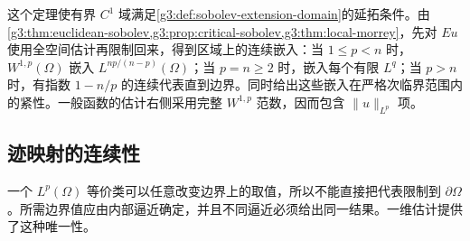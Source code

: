 这个定理使有界 \(C^1\) 域满足\cref{g3:def:sobolev-extension-domain}的延拓条件。由\cref{g3:thm:euclidean-sobolev,g3:prop:critical-sobolev,g3:thm:local-morrey}，先对 \(Eu\) 使用全空间估计再限制回来，得到区域上的连续嵌入：当 \(1\le p<n\) 时，\(W^{1,p}(\Omega)\) 嵌入 \(L^{np/(n-p)}(\Omega)\)；当 \(p=n\ge2\) 时，嵌入每个有限 \(L^q\)；当 \(p>n\) 时，有指数 \(1-n/p\) 的连续代表直到边界。同时给出这些嵌入在严格次临界范围内的紧性。一般函数的估计右侧采用完整 \(W^{1,p}\) 范数，因而包含 \(\|u\|_{L^p}\) 项。

\subsection{迹映射的连续性}
\label{g3:subsec:1106:02}
一个 \(L^p(\Omega)\) 等价类可以任意改变边界上的取值，所以不能直接把代表限制到 \(\partial\Omega\)。所需边界值应由内部逼近确定，并且不同逼近必须给出同一结果。一维估计提供了这种唯一性。

